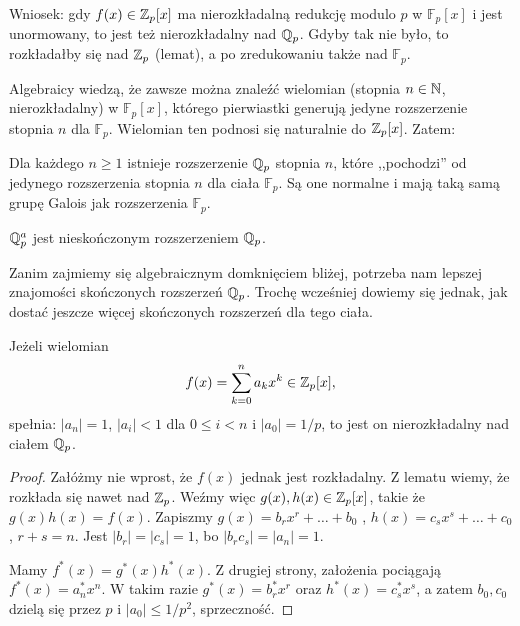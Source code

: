 Wniosek: gdy $f(x) \in \mathbb Z_p[x]$ ma nierozkładalną redukcję modulo $p$ w $\mathbb F_p[x]$ i jest unormowany, to jest też nierozkładalny nad $\mathbb Q_p$.
Gdyby tak nie było, to rozkładałby się nad $\mathbb Z_p$ (lemat), a po zredukowaniu także nad $\mathbb F_p$.

Algebraicy wiedzą, że zawsze można znaleźć wielomian (stopnia $n \in \mathbb N$, nierozkładalny) w $\mathbb F_p[x]$, którego pierwiastki generują jedyne rozszerzenie stopnia $n$ dla $\mathbb F_p$.
Wielomian ten podnosi się naturalnie do $\mathbb Z_p[x]$. Zatem:

\begin{fakt}
	Dla każdego $n \ge 1$ istnieje rozszerzenie $\mathbb Q_p$ stopnia $n$, które ,,pochodzi'' od jedynego rozszerzenia stopnia $n$ dla ciała $\mathbb F_p$.
	Są one normalne i mają taką samą grupę Galois jak rozszerzenia $\mathbb F_p$.
\end{fakt}

\begin{wniosek}
	$\mathbb Q_p^a$ jest nieskończonym rozszerzeniem $\mathbb Q_p$.
\end{wniosek}

Zanim zajmiemy się algebraicznym domknięciem bliżej, potrzeba nam lepszej znajomości skończonych rozszerzeń $\mathbb Q_p$.
Trochę wcześniej dowiemy się jednak, jak dostać jeszcze więcej skończonych rozszerzeń dla tego ciała.

\begin{twierdzenie}\label{einstein}
	Jeżeli wielomian
	\[
		f(x) = \sum_{k=0}^n a_kx^k \in \mathbb Z_p[x],
	\]
	spełnia: $|a_n| = 1$, $|a_i| < 1$ dla $0 \le i < n$ i $|a_0| = 1/p$, to jest on nierozkładalny nad ciałem $\mathbb Q_p$.
\end{twierdzenie}

\begin{proof}
	Załóżmy nie wprost, że $f(x)$ jednak jest rozkładalny.
	Z lematu wiemy, że rozkłada się nawet nad $\mathbb Z_p$.
	Weźmy więc $g(x), h(x) \in \mathbb Z_p[x]$, takie że $g(x) h(x) = f(x)$.
	Zapiszmy $g(x) = b_rx^r + \dots + b_0$ , $h(x) = c_s x^s + \dots + c_0$, $r+s = n$.
	Jest $|b_r| = |c_s| = 1$, bo $|b_rc_s| = |a_n| = 1$.

	Mamy $f^*(x) = g^*(x)h^*(x)$.
	Z drugiej strony, założenia pociągają $f^*(x) = a_n^* x^n$.
	W takim razie $g^*(x) = b^*_r x^r$ oraz $h^*(x) = c_s^* x^s$, a zatem $b_0, c_0$ dzielą się przez $p$ i $|a_0| \le 1/p^2$, sprzeczność.
\end{proof}